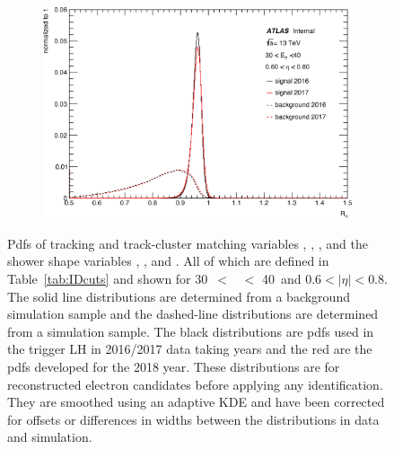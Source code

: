 \begin{figure}[p]
\begin{subfigure}[b]{0.49\textwidth}
    \includegraphics[width=1.0\textwidth]{figs/egamma/trig_reta_highet.png} 
    \label{fig:egamma:trig_reta}
  \end{subfigure}
  \caption[Pdfs of tracking and track-cluster matching variables \TRTPID, \deltaeta, \deltaphires, and the shower shape variables \weta, \rhad, and \reta.]{Pdfs of tracking and track-cluster matching variables \TRTPID, \deltaeta, \deltaphires, and the shower shape variables \weta, \rhad, and \reta.
  All of which are defined in Table~\ref{tab:IDcuts} and shown for
  30~\GeV $<$ \et\ $<$ 40~\GeV and $0.6<|\eta|<0.8$.
  The solid line distributions are determined from a background simulation sample and the dashed-line distributions are determined from a \Zee simulation sample.
  The black distributions are pdfs used in the trigger LH in 2016/2017 data taking years and the red are the pdfs developed for the 2018 year.
  These distributions are for reconstructed electron candidates before applying any identification.
  They are smoothed using an adaptive KDE and have been corrected for offsets or differences in widths between the distributions in data and simulation.
  }
\end{figure}
